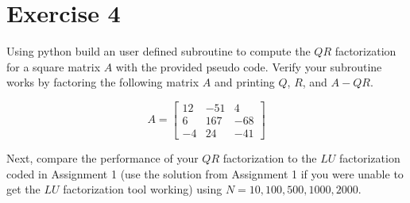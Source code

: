 \section{Exercise 4}
Using python build an user defined subroutine to compute the $QR$
factorization for a square matrix $A$ with the provided pseudo code. Verify
your subroutine works by factoring the following matrix $A$ and printing
$Q$, $R$, and $A-QR$.

\begin{equation}
  A =
  \begin{bmatrix}
    12  &  -51   &  4   \\
    6   &  167   &  -68   \\
    -4  &  24    &  -41
  \end{bmatrix}
\end{equation}

Next, compare the performance of your $QR$ factorization to the $LU$
factorization coded in Assignment 1 (use the solution from Assignment 1 if
you were unable to get the $LU$ factorization tool working) using $N = 10,
100, 500, 1000, 2000$.
